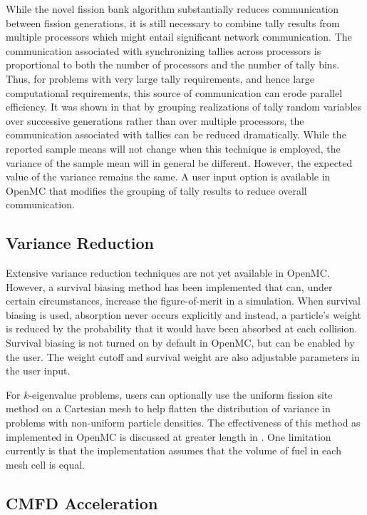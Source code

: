 \documentclass{snamc2013}
\begin{document}
While the novel fission bank algorithm substantially reduces communication
between fission generations, it is still necessary to combine tally results from
multiple processors which might entail significant network communication. The
communication associated with synchronizing tallies across processors is
proportional to both the number of processors and the number of tally
bins. Thus, for problems with very large tally requirements, and hence large
computational requirements, this source of communication can erode parallel
efficiency. It was shown in \cite{trans-romano-2012} that by grouping
realizations of tally random variables over successive generations rather than
over multiple processors, the communication associated with tallies can be
reduced dramatically. While the reported sample means will not change when this
technique is employed, the variance of the sample mean will in general be
different. However, the expected value of the variance remains the same. A user
input option is available in OpenMC that modifies the grouping of tally results
to reduce overall communication.

\subsection{Variance Reduction}

Extensive variance reduction techniques are not yet available in
OpenMC. However, a survival biasing method has been implemented that can, under
certain circumstances, increase the figure-of-merit in a simulation. When
survival biasing is used, absorption never occurs explicitly and instead, a
particle's weight is reduced by the probability that it would have been absorbed
at each collision. Survival biasing is not turned on by default in OpenMC, but
can be enabled by the user. The weight cutoff and survival weight are also
adjustable parameters in the user input.

For $k$-eigenvalue problems, users can optionally use the uniform fission site
method \cite{physor-kelly-2012} on a Cartesian mesh to help flatten the
distribution of variance in problems with non-uniform particle densities. The
effectiveness of this method as implemented in OpenMC is discussed at greater
length in \cite{mc-romano-2013}. One limitation currently is that the
implementation assumes that the volume of fuel in each mesh cell is equal. 

\subsection{CMFD Acceleration}
\end{document}
